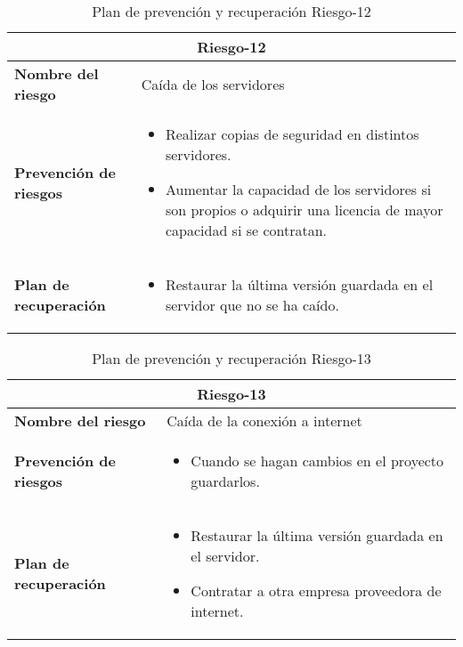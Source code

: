 \begin{table}[H]
\begin{center}
\begin{tabular}{p{} p{10cm}}
\multicolumn{2}{c}{\textbf{Riesgo-12} } \\
\hline \hline
\textbf{Nombre del riesgo} & Caída de los servidores \\
\hline
\textbf{Prevención de riesgos} & \begin{itemize}[-]
  \item Realizar copias de seguridad en distintos servidores.
  \item Aumentar la capacidad de los servidores si son propios o adquirir una licencia de mayor capacidad si se contratan.
  \end{itemize} \\
\hline
\textbf{Plan de recuperación} &   \begin{itemize}[-]
  \item Restaurar la última versión guardada en el servidor que no se ha caído.
  \end{itemize}\\
\hline
\end{tabular}
\caption{Plan de prevención y recuperación Riesgo-12}
\label{tab:Riesgo-12-Prev_Recup}
\end{center}
\end{table}

\begin{table}[H]
\begin{center}
\begin{tabular}{p{} p{10cm}}
\multicolumn{2}{c}{\textbf{Riesgo-13} } \\
\hline \hline
\textbf{Nombre del riesgo} & Caída de la conexión a internet \\
\hline
\textbf{Prevención de riesgos} & \begin{itemize}[-]
  \item Cuando se hagan cambios en el proyecto guardarlos.
  \end{itemize} \\
\hline
\textbf{Plan de recuperación} &   \begin{itemize}[-]
  \item Restaurar la última versión guardada en el servidor.
  \item Contratar a otra empresa proveedora de internet.
  \end{itemize}\\
\hline
\end{tabular}
\caption{Plan de prevención y recuperación Riesgo-13}
\label{tab:Riesgo-13-Prev_Recup}
\end{center}
\end{table}

